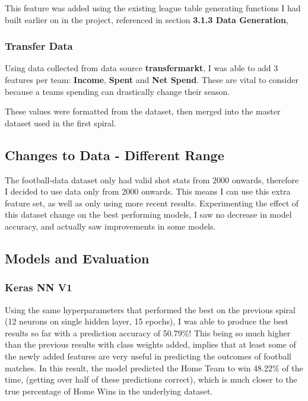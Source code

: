 \documentclass[12pt,a4paper,twoside,openright]{report}
\begin{document}
This feature was added using the existing league table generating functions I had built earlier on in the project, referenced in section \textbf{3.1.3 Data Generation},

\subsubsection{Transfer Data}

Using data collected from data source \textbf{transfermarkt}, I was able to add 3 features per team: \textbf{Income}, \textbf{Spent} and \textbf{Net Spend}. These are vital to consider because a teams spending can drastically change their season.

These values were formatted from the dataset, then merged into the master dataset used in the first spiral.

\subsection{Changes to Data - Different Range}

The football-data dataset only had valid shot stats from 2000 onwards, therefore I decided to use data only from 2000 onwards. This means I can use this extra feature set, as well as only using more recent results. Experimenting the effect of this dataset change on the best performing models, I saw no decrease in model accuracy, and actually saw improvements in some models.

\subsection{Models and Evaluation}

\subsubsection{Keras NN V1}

Using the same hyperparameters that performed the best on the previous spiral (12 neurons on single hidden layer, 15 epochs), I was able to produce the best results so far with a prediction accuracy of 50.79\%! This being so much higher than the previous results with class weights added, implies that at least some of the newly added features are very useful in predicting the outcomes of football matches. In this result, the model predicted the Home Team to win 48.22\% of the time, (getting over half of these predictions correct), which is much closer to the true percentage of Home Wins in the underlying dataset.
\end{document}
